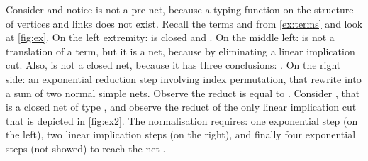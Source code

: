 \begin{example}\label{ex:nets}
Consider 
and notice  is not a pre-net,
because a typing function on the structure of vertices and links does not exist.
Recall the terms  and  from \autoref{ex:terms}
and look at \autoref{fig:ex}.
On the left extremity:
   is closed and .
On the middle left:  is not a translation of a term,
but it is a net,
  because  by eliminating a linear implication 
cut.
Also,  is not a closed net,
 because it has three conclusions: .
On the right side: an exponential reduction step involving index permutation,
that rewrite  into a sum of two normal simple nets.
Observe the reduct is equal to
  .
Consider ,
that is a closed net of type ,
and observe the reduct  of the only linear implication cut
that is depicted in \autoref{fig:ex2}.
The normalisation requires: one exponential step (on the left),
two linear implication steps (on the right),
and finally four exponential steps (not showed) to reach the net
.
\end{example}

